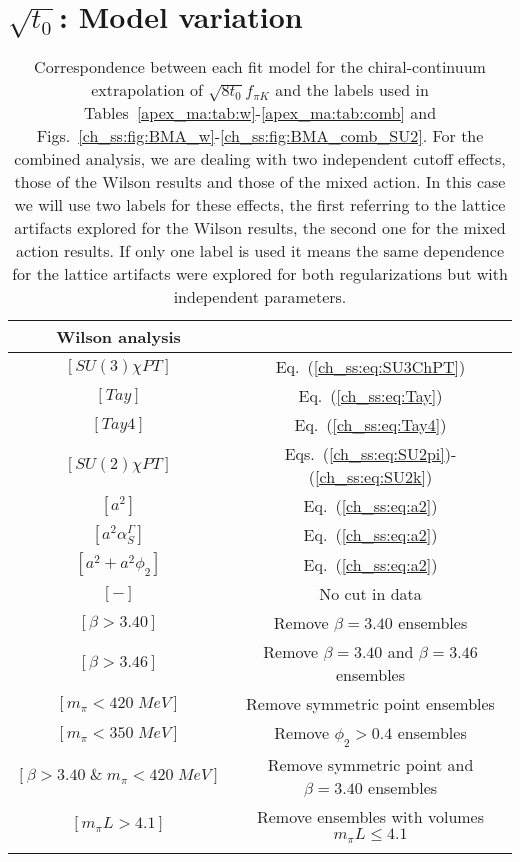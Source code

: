 
\chapter{$\sqrt{t_0}$: Model variation}
\label{apex_model_av_t0}


\begin{longtable}{c | c}
\label{apex_ma:tab:labels}
Wilson analysis \\
\toprule
$[SU(3)\chi PT]$ & Eq.~(\ref{ch_ss:eq:SU3ChPT}) \\
$[Tay]$ & Eq.~(\ref{ch_ss:eq:Tay}) \\
$[Tay4]$ & Eq.~(\ref{ch_ss:eq:Tay4}) \\
$[SU(2)\chi PT]$ & Eqs.~(\ref{ch_ss:eq:SU2pi})-(\ref{ch_ss:eq:SU2k}) \\
\midrule
$[a^2]$ & Eq.~(\ref{ch_ss:eq:a2}) \\
$[a^2\alpha_S^{\Gamma}]$ & Eq.~(\ref{ch_ss:eq:a2}) \\
$[a^2+a^2\phi_2]$ & Eq.~(\ref{ch_ss:eq:a2}) \\
\midrule
$[-]$ & No cut in data \\
$[\beta>3.40]$ & Remove $\beta=3.40$ ensembles \\
$[\beta>3.46]$ & Remove $\beta=3.40$ and $\beta=3.46$ ensembles \\
$[m_{\pi}<420\;MeV]$ & Remove symmetric point ensembles \\
$[m_{\pi}<350\;MeV]$ & Remove $\phi_2>0.4$ ensembles \\
$[\beta>3.40\;\&\;m_{\pi}<420\;MeV]$ & Remove symmetric point and $\beta=3.40$ ensembles \\
$[m_{\pi}L>4.1]$ & Remove ensembles with volumes $m_{\pi}L\leq4.1$ \\
\bottomrule
\caption{Correspondence between each fit model for the chiral-continuum extrapolation of $\sqrt{8t_0}f_{\pi K}$ and the labels used in Tables~\ref{apex_ma:tab:w}-\ref{apex_ma:tab:comb} and Figs.~\ref{ch_ss:fig:BMA_w}-\ref{ch_ss:fig:BMA_comb_SU2}. For the combined analysis, we are dealing with two independent cutoff effects, those of the Wilson results and those of the mixed action. In this case we will use two labels for these effects, the first referring to the lattice artifacts explored for the Wilson results, the second one for the mixed action results. If only one label is used it means the same dependence for the lattice artifacts were explored for both regularizations but with independent parameters.}
\end{longtable}

